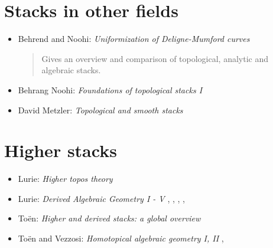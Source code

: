 \section{Stacks in other fields}
\label{section-stacks-areas}

\begin{itemize}
\item Behrend and Noohi: \emph{Uniformization of Deligne-Mumford curves}
\cite{behrend-noohi}
\begin{quote}
Gives an overview and comparison of topological, analytic and algebraic stacks.
\end{quote}
\item Behrang Noohi: \emph{Foundations of topological stacks I} \cite{noohi}
\item David Metzler: \emph{Topological and smooth stacks} \cite{metzler}
\end{itemize}


\section{Higher stacks}
\label{section-higher-stacks}

\begin{itemize}
\item Lurie: \emph{Higher topos theory} \cite{lurie_topos}
\item Lurie: \emph{Derived Algebraic Geometry I - V}
\cite{dag1}, \cite{dag2}, \cite{dag3}, \cite{dag4}, \cite{dag5}
\item To\"en: \emph{Higher and derived stacks: a global overview}
\cite{toen_higher}
\item To\"en and Vezzosi: \emph{Homotopical algebraic geometry I, II}
\cite{hag1}, \cite{hag2}
\end{itemize}








